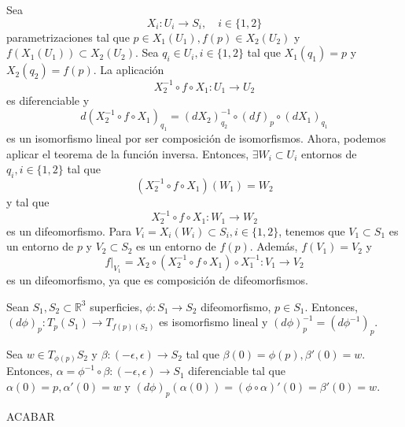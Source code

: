 \begin{dem}
  Sea
  \[
    X_{i}: U_{i} \to S_{i}, \quad i \in \{ 1, 2 \}
  \]
  parametrizaciones tal que $p \in X_{1}(U_{1}), f(p) \in X_{2}(U_{2})$ y $f(X_{1}(U_{1})) \subset X_{2}(U_{2})$. Sea $q_{i} \in U_{i}, i \in \{ 1, 2 \}$ tal que $X_{1}(q_{1}) = p$ y $X_{2}(q_{2}) = f(p)$. La aplicación
  \[
    X_{2}^{-1} \circ f \circ X_{1} : U_{1} \to U_{2}
  \]
  es diferenciable y
  \[
    d(X_{2}^{-1} \circ f \circ X_{1})_{q_{1}} = (d X_{2})_{q_{2}}^{-1} \circ (d f)_{p} \circ (d X_{1})_{q_{1}}
  \]
  es un isomorfismo lineal por ser composición de isomorfismos. Ahora, podemos aplicar el teorema de la función inversa. Entonces, $\exists W_{i} \subset U_{i}$ entornos de $q_{i}, i \in \{ 1, 2 \}$ tal que
  \[
    (X_{2}^{-1} \circ f \circ X_{1})(W_{1}) = W_{2}
  \]
  y tal que
  \[ 
    X_{2}^{-1} \circ f \circ X_{1} : W_{1} \to W_{2} 
  \] 
  es un difeomorfismo. Para $V_{i} = X_{i}(W_{i}) \subset S_{i}, i \in \{ 1, 2 \}$, tenemos que $V_{1} \subset S_{1}$ es un entorno de $p$ y $V_{2}\subset S_{2}$ es un entorno de $f(p)$. Además, $f(V_{1}) = V_{2}$ y
  \[
    f|_{V_{1}} = X_{2} \circ (X_{2}^{-1} \circ f \circ X_{1}) \circ X_{1}^{-1} : V_{1} \to V_{2}
  \]
  es un difeomorfismo, ya que es composición de difeomorfismos.
\end{dem}

\begin{prop}
  Sean $S_{1}, S_{2} \subset \mathbb{R}^{3}$ superficies, $\phi : S_{1} \to S_{2}$ difeomorfismo, $ p \in S_{1}$. Entonces, $(d \phi)_{p} : T_{p}(S_{1}) \to T_{f(p)(S_{2})}$ es isomorfismo lineal y $(d \phi)_{p}^{-1} = (d \phi ^{-1})_{p}$.
\end{prop}

\begin{dem}
  Sea $w \in T_{\phi(p)}S_{2}$ y $\beta : (-\epsilon, \epsilon) \to S_{2}$ tal que $\beta(0) = \phi(p), \beta'(0) = w$. Entonces, $\alpha = \phi^{-1} \circ \beta : (-\epsilon, \epsilon) \to S_{1}$ diferenciable tal que $\alpha(0) = p, \alpha'(0) = w$ y $(d \phi)_{p}(\alpha(0)) = (\phi \circ \alpha)'(0) = \beta'(0) = w$. 

  ACABAR
\end{dem}

%
